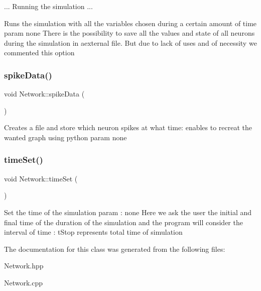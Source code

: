 ... Running the simulation ...

Runs the simulation with all the variables chosen during a certain amount of time param none There is the possibility to save all the values and state of all neurons during the simulation in aexternal file. But due to lack of uses and of necessity we commented this option \mbox{\label{class_network_a051978c15b901e42c7353d8dff33120d}} 
\subsubsection{\texorpdfstring{spike\+Data()}{spikeData()}}
{\footnotesize\ttfamily void Network\+::spike\+Data (\begin{DoxyParamCaption}{ }\end{DoxyParamCaption})}

Creates a file and store which neuron spikes at what time\+: enables to recreat the wanted graph using python param none \mbox{\label{class_network_a283257767adc8e004991b6fd14e1fc1d}} 
\subsubsection{\texorpdfstring{time\+Set()}{timeSet()}}
{\footnotesize\ttfamily void Network\+::time\+Set (\begin{DoxyParamCaption}{ }\end{DoxyParamCaption})}

Set the time of the simulation param \+: none Here we ask the user the initial and final time of the duration of the simulation and the program will consider the interval of time \+: t\+Stop represents total time of simulation 

The documentation for this class was generated from the following files\+:\begin{DoxyCompactItemize}
\item 
Network.\+hpp\item 
Network.\+cpp\end{DoxyCompactItemize}
